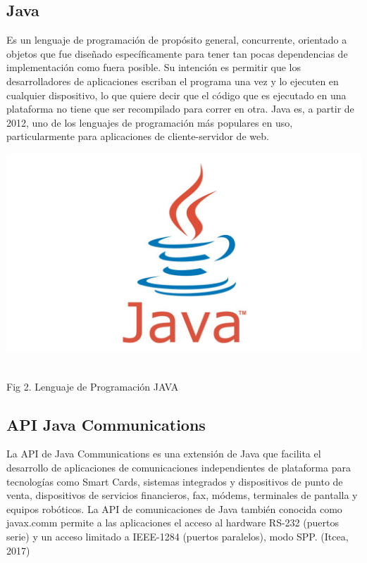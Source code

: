 \documentclass[letterpaper, 10 pt, conference]{ieeeconf}
\begin{document}
\subsection{Java}

Es un lenguaje de programación de propósito general, concurrente, orientado a objetos que fue diseñado específicamente para tener tan pocas dependencias de implementación como fuera posible. Su intención es permitir que los desarrolladores de aplicaciones escriban el programa una vez y lo ejecuten en cualquier dispositivo, lo que quiere decir que el código que es ejecutado en una plataforma no tiene que ser recompilado para correr en otra. Java es, a partir de 2012, uno de los lenguajes de programación más populares en uso, particularmente para aplicaciones de cliente-servidor de web.
\begin{center}
\includegraphics[scale=0.2]{Documento/Figuras/fig3.png}
\begin{scriptsize}\\ 
Fig 2. Lenguaje de Programación JAVA
\end{scriptsize}
\end{center}

\subsection{API Java Communications}

La API de Java Communications es una extensión de Java que facilita el desarrollo de aplicaciones de comunicaciones independientes de plataforma para tecnologías como Smart Cards, sistemas integrados y dispositivos de punto de venta, dispositivos de servicios financieros, fax, módems, terminales de pantalla y equipos robóticos.
La API de comunicaciones de Java también conocida como javax.comm permite a las aplicaciones el acceso al hardware RS-232 (puertos serie) y un acceso limitado a IEEE-1284 (puertos paralelos), modo SPP. (Itcea, 2017)
\end{document}
